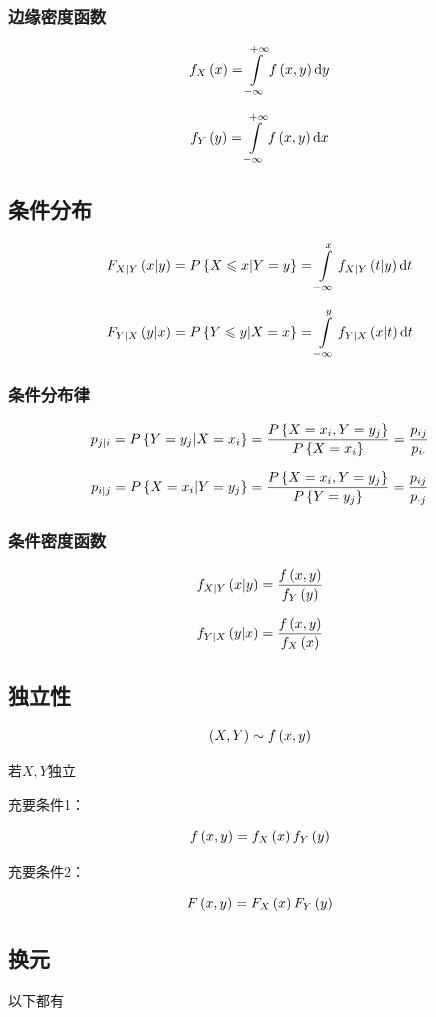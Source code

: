 \documentclass{article}
\begin{document}
\subsubsection{边缘密度函数}

\[f_X\left(x\right)=\int\limits_{-\infty}^{+\infty} f\left(x,y\right)\mathrm d y\]

\[f_Y\left(y\right)=\int\limits_{-\infty}^{+\infty} f\left(x,y\right)\mathrm d x\]

\subsection{条件分布}

\[F_{X|Y}\left(x|y\right)=P\left\{X\leqslant x|Y=y\right\}=\int\limits_{-\infty}^x f_{X|Y}\left(t|y\right)\mathrm d t\]

\[F_{Y|X}\left(y|x\right)=P\left\{Y\leqslant y|X=x\right\}=\int\limits_{-\infty}^y f_{Y|X}\left(x|t\right)\mathrm d t\]

\subsubsection{条件分布律}

\[p_{j|i}=P\left\{Y=y_j|X=x_i\right\}=\frac{P\left\{X=x_i,Y=y_j\right\}}{P\left\{X=x_i\right\}}=\frac{p_{ij}}{p_{i\cdot}}\]

\[p_{i|j}=P\left\{X=x_i|Y=y_j\right\}=\frac{P\left\{X=x_i,Y=y_j\right\}}{P\left\{Y=y_j\right\}}=\frac{p_{ij}}{p_{\cdot j}}\]

\subsubsection{条件密度函数}

\[f_{X|Y}\left(x|y\right)=\frac{f\left(x,y\right)}{f_Y\left(y\right)}\]

\[f_{Y|X}\left(y|x\right)=\frac{f\left(x,y\right)}{f_X\left(x\right)}\]

\subsection{独立性}

\[\left(X,Y\right)\sim f\left(x,y\right)\]

若$X,Y$独立

充要条件1：

\[f\left(x,y\right)=f_X\left(x\right)f_Y\left(y\right)\]

充要条件2：

\[F\left(x,y\right)=F_X\left(x\right)F_Y\left(y\right)\]

\subsection{换元}

以下都有
\end{document}
